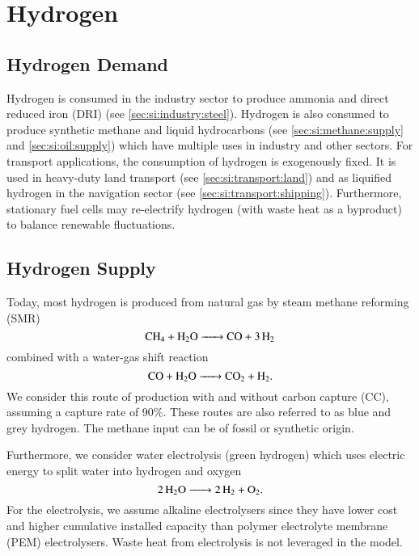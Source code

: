 \section{Hydrogen}
\label{sec:si:h2}

\subsection{Hydrogen Demand}
\label{sec:si:h2:demand}

Hydrogen is consumed in the industry sector to produce ammonia and direct
reduced iron (DRI) (see \cref{sec:si:industry:steel}). Hydrogen is also consumed
to produce synthetic methane and liquid hydrocarbons (see
\cref{sec:si:methane:supply} and \cref{sec:si:oil:supply}) which have multiple
uses in industry and other sectors. For transport applications, the consumption
of hydrogen is exogenously fixed. It is used in heavy-duty land transport (see
\cref{sec:si:transport:land}) and as liquified hydrogen in the navigation sector
(see \cref{sec:si:transport:shipping}). Furthermore, stationary fuel cells may
re-electrify hydrogen (with waste heat as a byproduct) to balance renewable
fluctuations.

\subsection{Hydrogen Supply}
\label{sec:si:h2:supply}

Today, most hydrogen is produced from natural gas by steam methane reforming
(SMR)
\begin{equation}
    \ce{ CH4 + H2O -> CO + 3H2 }
\end{equation}
combined with a water-gas shift reaction
\begin{equation}
    \ce{CO + H2O -> CO2 + H2}.
\end{equation}
We consider this route of production with and without carbon capture (CC),
assuming a capture rate of 90\%. These routes are also referred to as blue and
grey hydrogen. The methane input can be of fossil or synthetic origin.

Furthermore, we consider water electrolysis (green hydrogen) which uses electric
energy to split water into hydrogen and oxygen
\begin{equation}
    \ce{2H2O -> 2 H2 + O2}.
\end{equation}
For the electrolysis, we assume alkaline electrolysers since they have lower
cost \citeS{} and higher cumulative installed capacity \citeS{} than polymer
electrolyte membrane (PEM) electrolysers. Waste heat from electrolysis is not
leveraged in the model.

